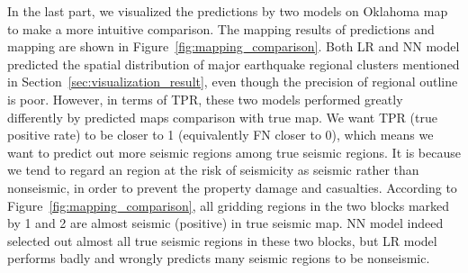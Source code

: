 \documentclass[final-report]{report-template}
\begin{document}
In the last part, we visualized the predictions by two models on Oklahoma map to make a more intuitive comparison.
The mapping results of predictions and mapping are shown in Figure~\ref{fig:mapping_comparison}. 
Both LR and NN model predicted the spatial distribution of major earthquake regional clusters mentioned in Section~\ref{sec:visualization_result}, even though the precision of regional outline is poor.
However, in terms of TPR, these two models performed greatly differently by predicted maps comparison with true map.
We want TPR (true positive rate) to be closer to 1 (equivalently FN closer to 0), which means we want to predict out more seismic regions among true seismic regions.
It is because we tend to regard an region at the risk of seismicity as seismic rather than nonseismic, in order to prevent the property damage and casualties.
According to Figure~\ref{fig:mapping_comparison}, all gridding regions in the two blocks marked by 1 and 2 are almost seismic (positive) in true seismic map.
NN model indeed selected out almost all true seismic regions in these two blocks, but LR model performs badly and wrongly predicts many seismic regions to be nonseismic.
\end{document}

